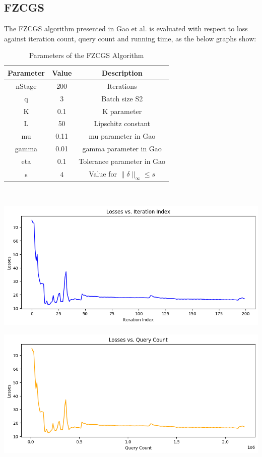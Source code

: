 \documentclass[10pt,twocolumn,letterpaper]{article}
\begin{document}
\subsection{FZCGS}

The FZCGS algorithm presented in Gao et al. is evaluated with respect to 
loss against iteration count, query count and running time, as the below graphs show:

\begin{table}[h]
   \centering
   \begin{tabular}{ccc}
       \hline
       Parameter & Value & Description \\
       \hline
       nStage & 200 & Iterations\\
       \hline
       q & 3 & Batch size S2\\
       \hline
       K & 0.1 & K parameter\\
       \hline
       L & 50 & Lipschitz constant \\
       \hline
       mu & 0.11 & mu parameter in Gao\\
       \hline
       gamma & 0.01 & gamma parameter in Gao\\
       \hline
       eta & 0.1 & Tolerance parameter in Gao\\
       \hline
       s & 4 & Value for $\|\delta\|_{\infty} \leq s$\\
       \hline
   \end{tabular}
   \
   \caption{Parameters of the FZCGS Algorithm} 
   \label{tab:fzcgs_params}
\end{table}


\begin{center}
   \includegraphics*[scale=0.35]{img/FZCGS_loss_vs_iterations.png}
\end{center}

\begin{center}
   \includegraphics*[scale=0.35]{img/FZCGS_loss_vs_querycount.png}
\end{center}
\end{document}
